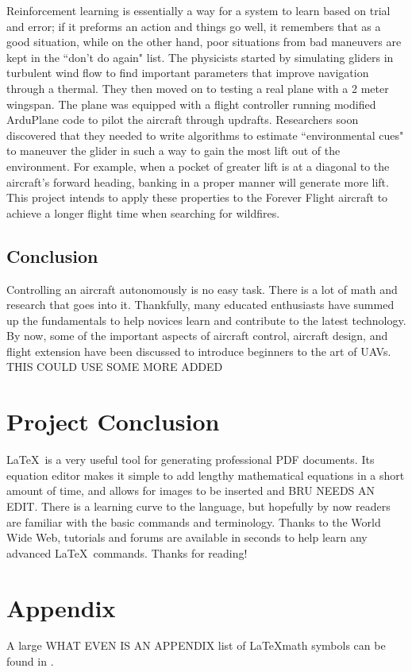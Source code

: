 \documentclass[12pt,journal,compsoc]{IEEEtran}
\begin{document}
Reinforcement learning is essentially a way for a system to learn based on trial and error; if it preforms an action and things go well, it remembers that as a good situation, while on the other hand, poor situations from bad maneuvers are kept in the ``don't do again" list. The physicists started by simulating gliders in turbulent wind flow to find important parameters that improve navigation through a thermal. They then moved on to testing a real plane with a 2 meter wingspan. The plane was equipped with a flight controller running modified ArduPlane code to pilot the aircraft through updrafts. Researchers soon discovered that they needed to write algorithms to estimate ``environmental cues" to maneuver the glider in such a way to gain the most lift out of the environment. For example, when a pocket of greater lift is at a diagonal to the aircraft's forward heading, banking in a proper manner will generate more lift. This project intends to apply these properties to the Forever Flight aircraft to achieve a longer flight time when searching for wildfires.

\subsection{Conclusion}
Controlling an aircraft autonomously is no easy task. There is a lot of math and research that goes into it. Thankfully, many educated enthusiasts have summed up the fundamentals to help novices learn and contribute to the latest technology. By now, some of the important aspects of aircraft control, aircraft design, and flight extension have been discussed to introduce beginners to the art of UAVs. THIS COULD USE SOME MORE ADDED

\section{Project Conclusion}
\LaTeX\ is a very useful tool for generating professional PDF documents. Its equation editor makes it simple to add lengthy mathematical equations in a short amount of time, and allows for images to be inserted and BRU NEEDS AN EDIT. There is a learning curve to the language, but hopefully by now readers are familiar with the basic commands and terminology. Thanks to the World Wide Web, tutorials and forums are available in seconds to help learn any advanced \LaTeX\ commands. Thanks for reading!


\appendices
\section*{Appendix}
A large WHAT EVEN IS AN APPENDIX list of \LaTeX math symbols can be found in \cite{Symbols}.
\end{document}
